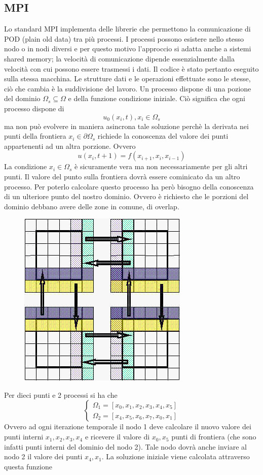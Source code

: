 \documentclass[italian]{article}
\begin{document}
\subsection{MPI}
Lo standard MPI implementa delle librerie che permettono la comunicazione di POD (plain old data) tra più processi. I processi possono esistere nello stesso nodo o in nodi diversi e per questo motivo l'approccio si adatta anche a sistemi shared memory; la velocità di comunicazione dipende essenzialmente dalla velocità con cui possono essere trasmessi i dati. Il codice è stato pertanto eseguito sulla stessa macchina. Le strutture dati e le operazioni effettuate sono le stesse, ciò che cambia è la suddivisione del lavoro. Un processo dispone di una pozione del dominio $\Omega_s \subseteq \Omega$ e della funzione condizione iniziale. Ciò significa che ogni processo dispone di 
$$ u_0(x_i,t), x_i \in \Omega_s$$
ma non può evolvere in maniera asincrona tale soluzione perchè la derivata nei punti della frontiera $x_i \in \partial \Omega_s$ richiede la conoscenza del valore dei punti appartenenti ad un altra porzione. Ovvero 
$$u(x_i,t+1) = f(x_{i+1}, x_i, x_{i-1})$$
La condizione $x_i \in \Omega_s$ è sicuramente vera ma non necessariamente per gli altri punti. Il valore del punto sulla frontiera dovrà essere cominicato da un altro processo. Per poterlo calcolare questo processo ha però bisogno della conoscenza di un ulteriore punto del nostro dominio. Ovvero è richiesto che le porzioni del dominio debbano avere delle zone in comune, di overlap.
\newpage
\begin{figure}[H]
\centering
  \includegraphics[width=0.5\linewidth]{ghostnodes.png}
\end{figure}
Per dieci punti e 2 processi si ha che
$$\begin{cases}
\Omega_1 = [x_0, x_1, x_2, x_3, x_4, x_5] \\
\Omega_2 = [x_4, x_5, x_6, x_7, x_0, x_1]
\end{cases}$$
Ovvero ad ogni iterazione temporale il nodo 1 deve calcolare il nuovo valore dei punti interni  $x_1, x_2, x_3, x_4$ e ricevere il valore di $x_0, x_5$ punti di frontiera (che sono infatti punti interni del dominio del nodo 2). Tale nodo dovrà anche inviare al nodo 2 il valore dei punti $x_4, x_1$.
La soluzione iniziale viene calcolata attraverso questa funzione
\begin{lstlisting}[language=C++]

\end{lstlisting}
\end{document}
